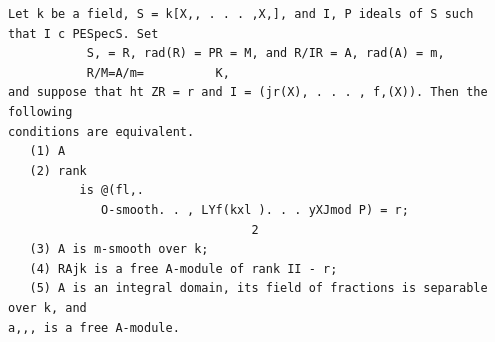 \begin{theorem}\label{mcrt-auto-theorem-30-3}\uses{}
\begin{verbatim}
Let k be a field, S = k[X,, . . . ,X,], and I, P ideals of S such
that I c PESpecS. Set
           S, = R, rad(R) = PR = M, and R/IR = A, rad(A) = m,
           R/M=A/m=          K,
and suppose that ht ZR = r and I = (jr(X), . . . , f,(X)). Then the following
conditions are equivalent.
   (1) A
   (2) rank
          is @(fl,.
             O-smooth. . , LYf(kxl ). . . yXJmod P) = r;
                                  2
   (3) A is m-smooth over k;
   (4) RAjk is a free A-module of rank II - r;
   (5) A is an integral domain, its field of fractions is separable over k, and
a,,, is a free A-module.
\end{verbatim}
\end{theorem}
